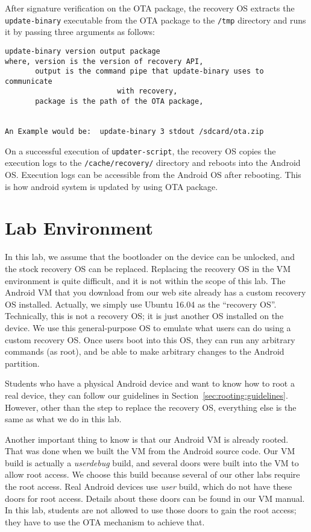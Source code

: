 After signature verification on the OTA package, the recovery OS extracts
the \texttt{update-binary} executable from the OTA package to 
the \texttt{/tmp} directory and runs it by passing three arguments as follows:  

\begin{lstlisting}[frame=single, caption={}, label=label]
update-binary version output package
where, version is the version of recovery API,
       output is the command pipe that update-binary uses to  communicate 
                          with recovery,
       package is the path of the OTA package,


An Example would be:  update-binary 3 stdout /sdcard/ota.zip
\end{lstlisting}
 

On a successful execution of \texttt{updater-script}, the recovery OS copies the
execution logs to the \texttt{/cache/recovery/} directory and reboots into the Android
OS. Execution logs can be accessible from the Android OS after rebooting.
This is how android system is updated by using OTA package.


\section{Lab Environment}

In this lab, we assume that the bootloader on the device can be unlocked,
and the stock recovery OS can be replaced. Replacing the recovery OS in the VM environment
is quite difficult, and it is not within the scope of this lab. The Android
VM that you download from our web site already has a custom recovery OS
installed. Actually, we simply use Ubuntu 16.04 as
the ``recovery OS''. Technically, this is not a recovery OS; it is just another OS
installed on the device. We use this general-purpose OS to emulate what
users can do using a custom recovery OS. Once users boot into this OS, they can run any
arbitrary commands (as root), and be able to make arbitrary changes to the
Android partition. 



Students who have a physical Android device and want to know how to root a
real device, they can follow our guidelines in
Section~\ref{sec:rooting:guidelines}. However, other than the step to replace
the recovery OS, everything else is the same as what we do in this lab.  


Another important thing to know is that our Android VM is already rooted. That was
done when we built the VM from the Android source code. Our VM build is
actually a \textit{userdebug} build, and several doors were built into the VM
to allow root access.  We choose this build because several of our other labs require the root
access. Real Android devices use \textit{user} build, which do not have these doors
for root access. Details about these doors can be found in our VM manual. 
In this lab, students are not allowed to use those doors to gain the root
access; they have to use the OTA mechanism to achieve that.



